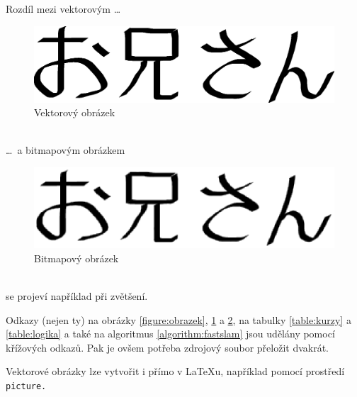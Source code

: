 \documentclass[a4paper, 11pt]{article}
\begin{document}
Rozdíl mezi vektorovým \dots
\begin{figure}[h]
    \begin{center}
    \includegraphics[scale=0.4]{oniisan.eps}
    \caption{Vektorový obrázek}
    \label{figure:vektor}
    \end{center}
\end{figure}\\
\dots\ a bitmapovým obrázkem
\begin{figure}[h]
    \begin{center}
    \includegraphics[scale=0.6]{oniisan2.eps}
    \caption{Bitmapový obrázek}
    \label{figure:bitmap}
    \end{center}
\end{figure}\\
se projeví například při zvětšení.

Odkazy (nejen ty) na obrázky \ref{figure:obrazek}, \ref{figure:vektor} a \ref{figure:bitmap},
na tabulky \ref{table:kurzy} a \ref{table:logika} a také na algoritmus \ref{algorithm:fastslam}
jsou udělány pomocí křížových odkazů. Pak je ovšem potřeba zdrojový soubor přeložit dvakrát.

Vektorové obrázky lze vytvořit i přímo v {\LaTeX}u, například pomocí prostředí\texttt{ picture.}

\pagebreak
\end{document}
